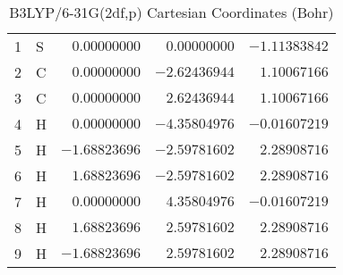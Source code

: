 \documentclass[10pt,oneside]{article}
\begin{document}
\begin{table}[h]
\centering
\caption{B3LYP/6-31G(2df,p) Cartesian Coordinates (Bohr)}
\begin{tabular}{llrrr}
\toprule
1  & S  & $ 0.00000000$ & $ 0.00000000$ & $-1.11383842$ \\
2  & C  & $ 0.00000000$ & $-2.62436944$ & $ 1.10067166$ \\
3  & C  & $ 0.00000000$ & $ 2.62436944$ & $ 1.10067166$ \\
4  & H  & $ 0.00000000$ & $-4.35804976$ & $-0.01607219$ \\
5  & H  & $-1.68823696$ & $-2.59781602$ & $ 2.28908716$ \\
6  & H  & $ 1.68823696$ & $-2.59781602$ & $ 2.28908716$ \\
7  & H  & $ 0.00000000$ & $ 4.35804976$ & $-0.01607219$ \\
8  & H  & $ 1.68823696$ & $ 2.59781602$ & $ 2.28908716$ \\
9  & H  & $-1.68823696$ & $ 2.59781602$ & $ 2.28908716$ \\
\bottomrule
\end{tabular}
\end{table}
\end{document}
